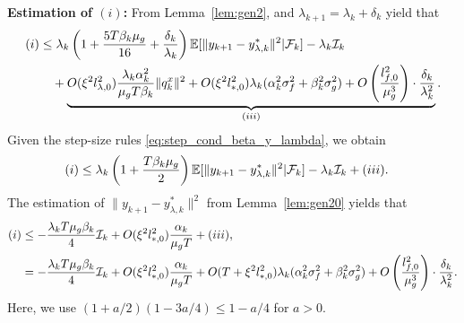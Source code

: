 \textbf{Estimation of $(i)$: } 
From Lemma~\ref{lem:gen2}, and $\lambda_{k+1} = \lambda_k + \delta_k$ yield that
\begin{align*}
    (i) &\le \lambda_k \left(1 + \frac{5 T \beta_k\mu_g }{16} + \frac{\delta_k}{\lambda_k} \right) \mathbb{E}[\|y_{k+1} - y_{\lambda, k}^*\|^2 | \mathcal{F}_k] -\lambda_k \mathcal{I}_k \\
    &\quad + \underbrace{O(\xi^2 l_{\lambda,0}^2) \frac{\lambda_k \alpha_k^2}{\mu_g T \beta_k} \|q_k^x\|^2 + O(\xi^2 l_{*,0}^2) \lambda_k (\alpha_k^2 \sigma_f^2 + \beta_k^2 \sigma_g^2) + O\left( \frac{l_{f,0}^2}{\mu_g^3} \right) \cdot \frac{\delta_k}{\lambda_k^2}}_{(iii)}.  
\end{align*}
Given the step-size rules \eqref{eq:step_cond_beta_y_lambda}, we obtain
\begin{align*}
    (i) &\le \lambda_k \left(1 + \frac{T \beta_k \mu_g}{2}\right) \mathbb{E}[\|y_{k+1} - y_{\lambda, k}^*\|^2 | \mathcal{F}_k] -\lambda_k \mathcal{I}_k  + (iii). 
\end{align*}
The estimation of $\|y_{k+1} - y_{\lambda, k}^*\|^2$ from Lemma~\ref{lem:gen20} yields that
\begin{align*}
    (i) &\le - \frac{\lambda_k T \mu_g \beta_k}{4} \mathcal{I}_k + O(\xi^2 l_{*,0}^2) \frac{\alpha_k}{\mu_g T} +  (iii),\\ 
    &= - \frac{\lambda_k T \mu_g \beta_k}{4} \mathcal{I}_k + O(\xi^2 l_{*,0}^2) \frac{\alpha_k}{\mu_g T} + O(T + \xi^2 l_{*,0}^2) \lambda_k (\alpha_k^2 \sigma_f^2 + \beta_k^2 \sigma_g^2) + O\left( \frac{l_{f,0}^2}{\mu_g^3} \right) \cdot \frac{\delta_k}{\lambda_k^2}.
\end{align*}
Here, we use $(1+a/2)(1-3a/4) \leq 1-a/4$ for $a>0$.


\medskip


